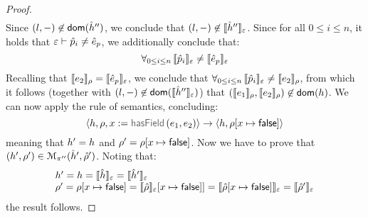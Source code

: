 \begin{proof}
$$\begin{array}{l}
\end{array}
$$
Since $(\loc, -) \not\in \domain(\sheap'')$, we conclude that $(\loc, -) \not\in \semexpr{\sheap''}{\senv}$. 
%
Since for all ${0 \leq i \leq n}$, it holds that $\senv \vdash \sexprp_i \neq \sexpr_p$, we additionally conclude that: 
$$
  \forall_{0 \leq i \leq n}  \, \symbeval{\sexprp_i}{\senv} \neq \symbeval{\sexpr_p}{\senv} 
$$
Recalling that $\symbeval{\jsilexpr_2}{\store} = \symbeval{\sexpr_p}{\senv}$, we conclude that  
$
  \forall_{0 \leq i \leq n}  \, \symbeval{\sexprp_i}{\senv} \neq \symbeval{\jsilexpr_2}{\store}
$, from which it follows (together with $(\loc, -) \not\in \domain(\semexpr{\sheap''}{\senv})$) that 
$(\symbeval{\jsilexpr_1}{\store}, \symbeval{\jsilexpr_2}{\store}) \not\in \domain(\heap)$.
%
We can now apply the  rule of \jsil semantics, concluding: 
$$
   \semtrans{\heap, \store, \jvar := \hasfield(\jsilexpr_1, \jsilexpr_2)}{\heap,  \store[\jvar \mapsto \jfalse]}
$$
meaning that $\heap' = \heap$ and $\store' = \store[\jvar \mapsto \jfalse]$. 
%
Now we have to prove that $(\heap', \store') \in \smodels{\sheap', \sstore'}{\pc''}$.
Noting that:
$$
\begin{array}{l}
\heap' = \heap = \semexpr{\sheap}{\senv} = \semexpr{\sheap'}{\senv} \\
 \store' = \store[\jvar \mapsto \jfalse] = \symbeval{\sstore}{\senv}[\jvar \mapsto \jfalse]] = \symbeval{\sstore[\jvar \mapsto \jfalse]}{\senv} = \symbeval{\sstore'}{\senv} 
\end{array}
$$
the result follows. 
\vspace{6pt}



\end{proof}
